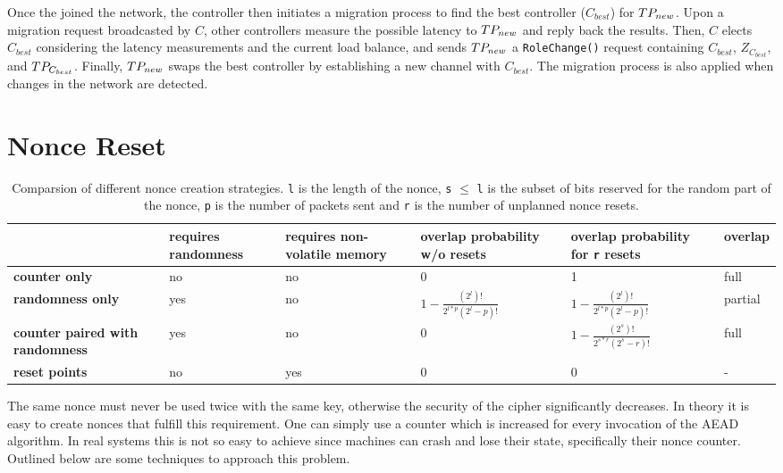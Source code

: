 Once the \tp joined the network, the controller then initiates a migration process to
find the best controller ($C_{best}$) for $TP_{new}$. Upon a migration request broadcasted
by $C$, other controllers measure the possible latency to $TP_{new}$ and reply back
the results. Then, $C$ elects $C_{best}$ considering the latency measurements and the
current load balance, and sends $TP_{new}$ a \texttt{RoleChange()} request containing
$C_{best}$, $Z_{C_{best}}$, and $TP_{C_{best}}$. Finally, $TP_{new}$ swaps the best
controller by establishing a new channel with $C_{best}$. The migration process
is also applied when changes in the network are detected.


\section{Nonce Reset}
\label{sec:nonce}

\begin{table}[htb]
	\footnotesize
	\caption{Comparsion of different nonce creation strategies. \texttt{l} is the length of the
		nonce, \texttt{s} $\leq$ \texttt{l} is the subset of bits reserved for the random part of the nonce,
		\texttt{p} is the number of packets sent and \texttt{r} is the number of unplanned nonce
	resets.}
	\label{tab:nonce}
	\renewcommand\arraystretch{2}
	\begin{tabularx}{1.1\linewidth}{|X|X|X|X|X|X|}
		\hline
		& \textbf{requires randomness} & \textbf{requires non-volatile memory} & \textbf{overlap probability w/o
		resets}  & \textbf{overlap probability for \texttt{r} resets} & \textbf{overlap}   \\
		\hline
		\textbf{counter only} & no & no  & 0 & 1 & full \\
		\hline
		\textbf{randomness only}                & yes & no  &
		$1-\frac{(2^l)!}{2^{l*p}(2^l-p)!}$
		& $1-\frac{(2^l)!}{2^{l*p}(2^l-p)!}$ & partial \\
		\hline
		\textbf{counter paired with randomness} & yes & no  & 0 & $1-\frac{(2^s)!}{2^{s*r}(2^s-r)!}$
		& full \\
		\hline
		\textbf{reset points} & no & yes & 0 & 0 & -    \\
		\hline
	\end{tabularx}%
\end{table}


The same nonce must never be used twice with the same key, otherwise the security of the
cipher significantly decreases. In theory it is easy to create nonces that fulfill this
requirement. One can simply use a counter which is increased for every invocation of the
AEAD algorithm. In real systems this is not so easy to achieve since machines can crash
and lose their state, specifically their nonce counter. Outlined below are some techniques
to approach this problem.

